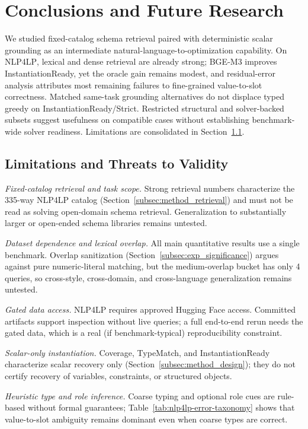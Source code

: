 \documentclass[pdflatex,sn-basic,Numbered]{sn-jnl}
\begin{document}
\section{Conclusions and Future Research}
\label{sec:conclusion}

We studied fixed-catalog schema retrieval paired with deterministic scalar grounding as an intermediate natural-language-to-optimization capability. On \textsc{NLP4LP}, lexical and dense retrieval are already strong; BGE-M3 improves InstantiationReady, yet the oracle gain remains modest, and residual-error analysis attributes most remaining failures to fine-grained value-to-slot correctness. Matched same-task grounding alternatives do not displace typed greedy on InstantiationReady/Strict. Restricted structural and solver-backed subsets suggest usefulness on compatible cases without establishing benchmark-wide solver readiness. Limitations are consolidated in Section~\ref{subsec:limitations}.

\subsection{Limitations and Threats to Validity}
\label{subsec:limitations}

\emph{Fixed-catalog retrieval and task scope.} Strong retrieval numbers characterize the 335-way NLP4LP catalog (Section~\ref{subsec:method_retrieval}) and must not be read as solving open-domain schema retrieval. Generalization to substantially larger or open-ended schema libraries remains untested.

\emph{Dataset dependence and lexical overlap.} All main quantitative results use a single benchmark. Overlap sanitization (Section~\ref{subsec:exp_significance}) argues against pure numeric-literal matching, but the medium-overlap bucket has only 4 queries, so cross-style, cross-domain, and cross-language generalization remains untested.

\emph{Gated data access.} NLP4LP requires approved Hugging Face access. Committed artifacts support inspection without live queries; a full end-to-end rerun needs the gated data, which is a real (if benchmark-typical) reproducibility constraint.

\emph{Scalar-only instantiation.} Coverage, TypeMatch, and InstantiationReady characterize scalar recovery only (Section~\ref{subsec:method_design}); they do not certify recovery of variables, constraints, or structured objects.

\emph{Heuristic type and role inference.} Coarse typing and optional role cues are rule-based without formal guarantees; Table~\ref{tab:nlp4lp-error-taxonomy} shows that value-to-slot ambiguity remains dominant even when coarse types are correct.
\end{document}
